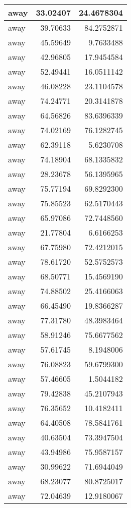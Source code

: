 \documentclass[
]{book}
\theoremstyle{definition}
\theoremstyle{definition}
\theoremstyle{definition}
\theoremstyle{definition}
\theoremstyle{remark}
\begin{document}
\begin{tabular}{l|r|r}
\hline
away & 33.02407 & 24.4678304\\
\hline
away & 39.70633 & 84.2752871\\
\hline
away & 45.59649 & 9.7633488\\
\hline
away & 42.96805 & 17.9454584\\
\hline
away & 52.49441 & 16.0511142\\
\hline
away & 46.08228 & 23.1104578\\
\hline
away & 74.24771 & 20.3141878\\
\hline
away & 64.56826 & 83.6396339\\
\hline
away & 74.02169 & 76.1282745\\
\hline
away & 62.39118 & 5.6230708\\
\hline
away & 74.18904 & 68.1335832\\
\hline
away & 28.23678 & 56.1395965\\
\hline
away & 75.77194 & 69.8292300\\
\hline
away & 75.85523 & 62.5170443\\
\hline
away & 65.97086 & 72.7448560\\
\hline
away & 21.77804 & 6.6166253\\
\hline
away & 67.75980 & 72.4212015\\
\hline
away & 78.61720 & 52.5752573\\
\hline
away & 68.50771 & 15.4569190\\
\hline
away & 74.88502 & 25.4166063\\
\hline
away & 66.45490 & 19.8366287\\
\hline
away & 77.31780 & 48.3983464\\
\hline
away & 58.91246 & 75.6677562\\
\hline
away & 57.61745 & 8.1948006\\
\hline
away & 76.08823 & 59.6799300\\
\hline
away & 57.46605 & 1.5044182\\
\hline
away & 79.42838 & 45.2107943\\
\hline
away & 76.35652 & 10.4182411\\
\hline
away & 64.40508 & 78.5841761\\
\hline
away & 40.63504 & 73.3947504\\
\hline
away & 43.94986 & 75.9587157\\
\hline
away & 30.99622 & 71.6944049\\
\hline
away & 68.23077 & 80.8725017\\
\hline
away & 72.04639 & 12.9180067\\

\end{tabular}
\end{document}
